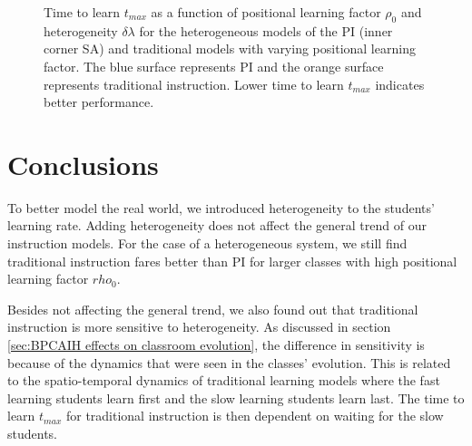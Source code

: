 \begin{figure}[htbp!]
   \caption[3D plots for the dependence of time to learn $t_{max}$ on both the positional learning factor $\rho_0$ and heterogeneity $\delta\lambda$]{Time to learn $t_{max}$ as a function of positional learning factor $\rho_0$ and heterogeneity $\delta\lambda$ for the heterogeneous models of the PI (inner corner SA) and traditional models with varying positional learning factor. 
   The blue surface represents PI and the orange surface represents traditional instruction.
   Lower time to learn $t_{max}$ indicates better performance.
   }
   \label{fig:2DBPCAIH rho-dl-t plots}
\end{figure}

\newpage %

\section{Conclusions}\label{sec:BPCAIH discussions}
To better model the real world, we introduced heterogeneity to the students' learning rate. 
Adding heterogeneity does not affect the general trend of our instruction models. 
For the case of a heterogeneous system, we still find traditional instruction fares better than PI for larger classes with high positional learning factor $rho_0$.

Besides not affecting the general trend, we also found out that traditional instruction is more sensitive to heterogeneity. 
As discussed in section \ref{sec:BPCAIH effects on classroom evolution}, the difference in sensitivity is because of the dynamics that were seen in the classes' evolution. 
This is related to the spatio-temporal dynamics of traditional learning models where the fast learning students learn first and the slow learning students learn last.
The time to learn $t_{max}$ for traditional instruction is then dependent on waiting for the slow students.


